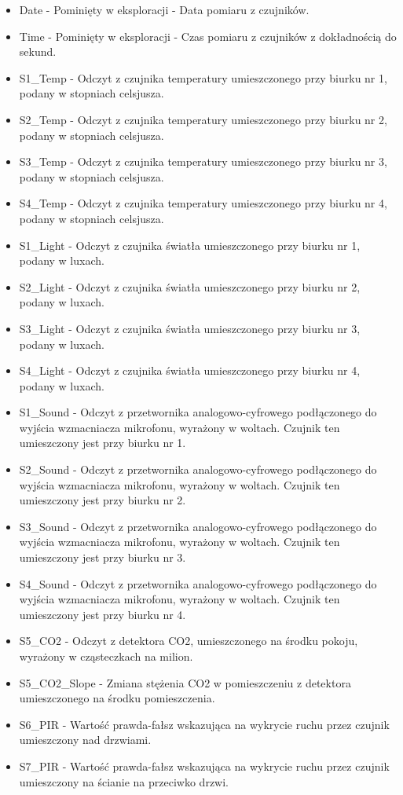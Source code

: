 \documentclass[12pt,oneside,a4paper]{book} %
\theoremstyle{break}
\begin{document}
\begin{itemize}
  \item Date - Pominięty w eksploracji - Data pomiaru z czujników.
  \item Time - Pominięty w eksploracji - Czas pomiaru z czujników z dokładnością do sekund.
  \item S1\_Temp - Odczyt z czujnika temperatury umieszczonego przy biurku nr 1, podany w stopniach celsjusza.
  \item S2\_Temp - Odczyt z czujnika temperatury umieszczonego przy biurku nr 2, podany w stopniach celsjusza.
  \item S3\_Temp - Odczyt z czujnika temperatury umieszczonego przy biurku nr 3, podany w stopniach celsjusza.
  \item S4\_Temp - Odczyt z czujnika temperatury umieszczonego przy biurku nr 4, podany w stopniach celsjusza.
  \item S1\_Light - Odczyt z czujnika światła umieszczonego przy biurku nr 1, podany w luxach.
  \item S2\_Light - Odczyt z czujnika światła umieszczonego przy biurku nr 2, podany w luxach.
  \item S3\_Light - Odczyt z czujnika światła umieszczonego przy biurku nr 3, podany w luxach.
  \item S4\_Light - Odczyt z czujnika światła umieszczonego przy biurku nr 4, podany w luxach.
  \item S1\_Sound - Odczyt z przetwornika analogowo-cyfrowego podłączonego do wyjścia wzmacniacza mikrofonu, wyrażony w woltach. Czujnik ten umieszczony jest przy biurku nr 1.
  \item S2\_Sound - Odczyt z przetwornika analogowo-cyfrowego podłączonego do wyjścia wzmacniacza mikrofonu, wyrażony w woltach. Czujnik ten umieszczony jest przy biurku nr 2.
  \item S3\_Sound - Odczyt z przetwornika analogowo-cyfrowego podłączonego do wyjścia wzmacniacza mikrofonu, wyrażony w woltach. Czujnik ten umieszczony jest przy biurku nr 3.
  \item S4\_Sound - Odczyt z przetwornika analogowo-cyfrowego podłączonego do wyjścia wzmacniacza mikrofonu, wyrażony w woltach. Czujnik ten umieszczony jest przy biurku nr 4.
  \item S5\_CO2 - Odczyt z detektora CO2, umieszczonego na środku pokoju, wyrażony w cząsteczkach na milion.
  \item S5\_CO2\_Slope - Zmiana stężenia CO2 w pomieszczeniu z detektora umieszczonego na środku pomieszczenia.
  \item S6\_PIR - Wartość prawda-fałsz wskazująca na wykrycie ruchu przez czujnik umieszczony nad drzwiami.
  \item S7\_PIR - Wartość prawda-fałsz wskazująca na wykrycie ruchu przez czujnik umieszczony na ścianie na przeciwko drzwi.
\end{itemize}
\end{document}
